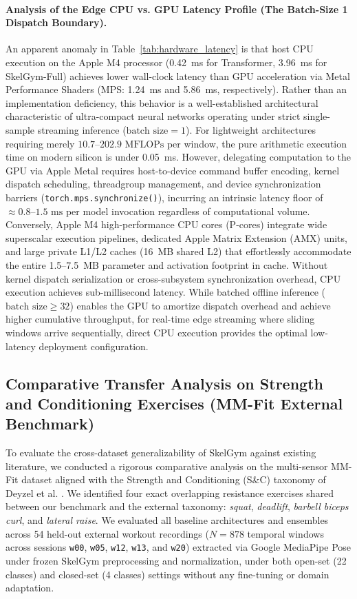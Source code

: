 \documentclass[runningheads]{llncs}
\begin{document}
\paragraph{Analysis of the Edge CPU vs. GPU Latency Profile (The Batch-Size 1 Dispatch Boundary).}
An apparent anomaly in Table~\ref{tab:hardware_latency} is that host CPU execution on the Apple M4 processor (0.42~ms for Transformer, 3.96~ms for SkelGym-Full) achieves lower wall-clock latency than GPU acceleration via Metal Performance Shaders (MPS: 1.24~ms and 5.86~ms, respectively). Rather than an implementation deficiency, this behavior is a well-established architectural characteristic of ultra-compact neural networks operating under strict single-sample streaming inference ($\text{batch size} = 1$). For lightweight architectures requiring merely $10.7\text{--}202.9\text{ MFLOPs}$ per window, the pure arithmetic execution time on modern silicon is under 0.05~ms. However, delegating computation to the GPU via Apple Metal requires host-to-device command buffer encoding, kernel dispatch scheduling, threadgroup management, and device synchronization barriers (\texttt{torch.mps.synchronize()}), incurring an intrinsic latency floor of $\approx 0.8\text{--}1.5\text{ ms}$ per model invocation regardless of computational volume. Conversely, Apple M4 high-performance CPU cores (P-cores) integrate wide superscalar execution pipelines, dedicated Apple Matrix Extension (AMX) units, and large private L1/L2 caches (16~MB shared L2) that effortlessly accommodate the entire 1.5--7.5~MB parameter and activation footprint in cache. Without kernel dispatch serialization or cross-subsystem synchronization overhead, CPU execution achieves sub-millisecond latency. While batched offline inference ($\text{batch size} \ge 32$) enables the GPU to amortize dispatch overhead and achieve higher cumulative throughput, for real-time edge streaming where sliding windows arrive sequentially, direct CPU execution provides the optimal low-latency deployment configuration.

\subsection{Comparative Transfer Analysis on Strength and Conditioning Exercises (MM-Fit External Benchmark)}
\label{sec:external_benchmark}
To evaluate the cross-dataset generalizability of SkelGym against existing literature, we conducted a rigorous comparative analysis on the multi-sensor MM-Fit dataset \cite{stromback2020} aligned with the Strength and Conditioning (S\&C) taxonomy of Deyzel et al. \cite{deyzel2023}. We identified four exact overlapping resistance exercises shared between our benchmark and the external taxonomy: \textit{squat}, \textit{deadlift}, \textit{barbell biceps curl}, and \textit{lateral raise}. We evaluated all baseline architectures and ensembles across 54 held-out external workout recordings ($N=878$ temporal windows across sessions \texttt{w00}, \texttt{w05}, \texttt{w12}, \texttt{w13}, and \texttt{w20}) extracted via Google MediaPipe Pose under frozen SkelGym preprocessing and normalization, under both open-set (22 classes) and closed-set (4 classes) settings without any fine-tuning or domain adaptation.
\end{document}
